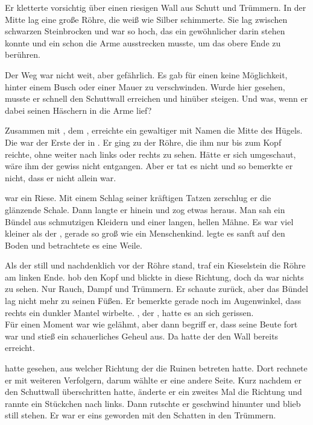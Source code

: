 \begin{huge}
Er kletterte vorsichtig über einen riesigen Wall aus Schutt und Trümmern. In der Mitte lag eine große Röhre, die weiß wie Silber schimmerte. Sie lag zwischen schwarzen Steinbrocken und war so hoch, das ein gewöhnlicher \Bangiri darin stehen konnte und ein {\Enlaender} schon die Arme ausstrecken musste, um das obere Ende zu berühren. 

Der Weg war nicht weit, aber gefährlich. Es gab für einen {\Schattenlaufer} keine Möglichkeit, hinter einem Busch oder einer Mauer zu verschwinden. Wurde {\Eno} hier gesehen, musste er schnell den Schuttwall erreichen und hinüber steigen. Und was, wenn er dabei seinen Häschern in die Arme lief?

Zusammen mit {\Eno}, dem {\Schattenlaufer}, erreichte ein gewaltiger {\Bangiri} mit Namen {\Pato} die Mitte des Hügels. Die {\Pato} war der Erste der {\Bangiri} in {\Tern}. Er ging zu der Röhre, die ihm nur bis zum Kopf reichte, ohne weiter nach links oder rechts zu sehen. Hätte er sich umgeschaut, wäre ihm der {\Schattenlaufer} gewiss nicht entgangen. Aber er tat es nicht und so bemerkte er nicht, dass er nicht allein war.

{\Pato} war ein Riese. Mit einem Schlag seiner kräftigen Tatzen zerschlug er die glänzende Schale. Dann langte er hinein und zog etwas heraus. Man sah ein Bündel aus schmutzigen Kleidern und einer langen, hellen Mähne. Es war viel kleiner als der {\Bangiri}, gerade so groß wie ein Menschenkind. {\Pato} legte es sanft auf den Boden und betrachtete es eine Weile. 

Als der {\Bangiri} still und nachdenklich vor der Röhre stand, traf ein Kieselstein die Röhre am linken Ende. {\Pato} hob den Kopf und blickte in diese Richtung, doch da war nichts zu sehen. Nur Rauch, Dampf und Trümmern. Er schaute zurück, aber das Bündel lag nicht mehr zu seinen Füßen. Er bemerkte gerade noch im Augenwinkel, dass rechts ein dunkler Mantel wirbelte. {\Eno}, der {\Schattenjager}, hatte es an sich gerissen.\\
Für einen Moment war {\Pato} wie gelähmt, aber dann begriff er, dass seine Beute fort war und stieß ein schauerliches Geheul aus. Da hatte der {\Schattenjager} den Wall bereits erreicht.

{\Eno} hatte gesehen, aus welcher Richtung der {\Bangiri} die Ruinen betreten hatte. Dort rechnete er mit weiteren Verfolgern, darum wählte er eine andere Seite. Kurz nachdem er den Schuttwall überschritten hatte, änderte er ein zweites Mal die Richtung und rannte ein Stückchen nach links. Dann rutschte er geschwind hinunter und blieb still stehen. Er war er eins geworden mit den Schatten in den Trümmern.


\end{huge}
